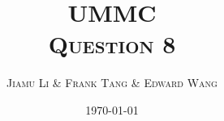 \usepackage{mathtools}
\usepackage{amssymb}
\usepackage{amsthm}
\usepackage{parskip}
\usepackage{cancel}

\usepackage[p,osf]{ETbb}
\usepackage[scaled=.95, type1]{cabin}
\usepackage[T1]{fontenc}
\usepackage[libertine, vvarbb]{newtxmath}
\usepackage{microtype}
\usepackage[sc]{titlesec}

\usepackage{minted}
\usepackage{FiraMono}
\usepackage[usenames, svgnames, dvipsnames, table]{xcolor}
\usepackage{hyperref}

\usepackage{fancyhdr}
\pagestyle{fancy}
\fancyhf{}
\setlength{\headheight}{25pt}
\fancyhead[R]{\scshape \nouppercase{\leftmark}}
\fancyfoot[C]{\thepage}
\renewcommand{\footrulewidth}{1pt}
\fancypagestyle{plain}{
  \renewcommand{\headrulewidth}{0pt}
  \renewcommand{\footrulewidth}{0pt}
  \fancyhf{}
}

\newtheorem{theorem}{\scshape Theorem}
\newtheorem{problem}{\scshape Question}
\newtheorem{claim}{\scshape Claim}[theorem]
\DeclareMathOperator{\prob}{Pr}

\title{\scshape {\Huge UMMC} \\[1em] Question 8}

\author{\scshape Jiamu Li \& Frank Tang \& Edward Wang}

\date{\scshape \today}
